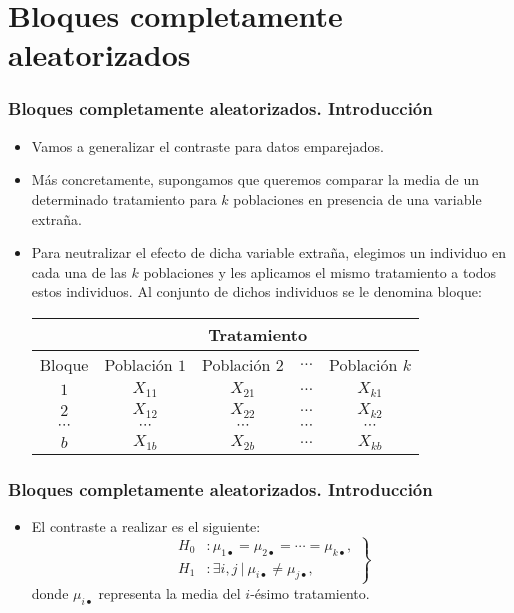 \section{Bloques completamente aleatorizados}
\begin{frame}
\frametitle{Bloques completamente aleatorizados. Introducción}
\begin{itemize}
\item<2-> Vamos a generalizar el contraste para datos emparejados.
\item<3-> Más concretamente, supongamos que queremos comparar la media de un determinado tratamiento para $k$ poblaciones en presencia de una variable extraña. 
\item<4-> Para neutralizar el efecto de dicha variable extraña, elegimos un individuo en cada una de las $k$ poblaciones y les aplicamos el mismo tratamiento a todos estos individuos. Al conjunto de dichos individuos se le denomina bloque:
{\small \begin{center}
\begin{tabular}{ccccc}
\hline
&\multicolumn{4}{c}{Tratamiento}\\\hline Bloque & Población $1$&Población $2$&$\ldots$&Población $k$\\\hline
$1$&$X_{11}$&$X_{21}$&$\ldots$&$X_{k1}$\\
$2$&$X_{12}$&$X_{22}$&$\ldots$&$X_{k2}$\\
$\cdots$&$\cdots$&$\cdots$&$\cdots$&$\cdots$\\
$b$&$X_{1b}$&$X_{2b}$&$\ldots$&$X_{kb}$\\\hline
\end{tabular}
\end{center}}
\end{itemize}
\end{frame}
\begin{frame}
\frametitle{Bloques completamente aleatorizados. Introducción}
\begin{itemize}
\item<2-> El contraste a realizar es el siguiente:
\[
\left.
\begin{array}{rl}
H_0 &: \mu_{1\bullet} =\mu_{2\bullet} =\cdots =\mu_{k\bullet}, \\
H_1 &: \exists i,j \ |\ \mu_{i\bullet} \not=\mu_{j\bullet},
\end{array}
\right\}
\]
donde $\mu_{i\bullet}$ representa la media del $i$-ésimo tratamiento.
\end{itemize}
\end{frame}

